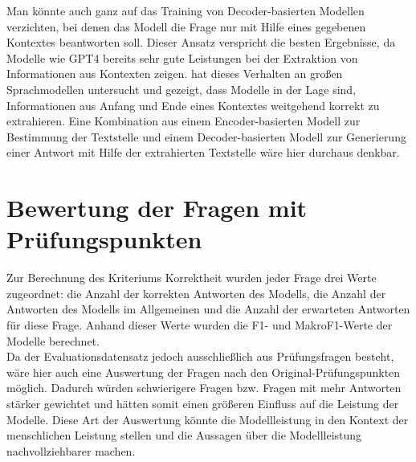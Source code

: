 Man könnte auch ganz auf das Training von Decoder-basierten Modellen verzichten, bei denen das Modell die Frage nur mit Hilfe eines gegebenen Kontextes beantworten soll.
Dieser Ansatz verspricht die besten Ergebnisse, da Modelle wie GPT4 bereits sehr gute Leistungen bei der Extraktion von Informationen aus Kontexten zeigen.
\citet{context-extract} hat dieses Verhalten an großen Sprachmodellen untersucht und gezeigt, dass Modelle in der Lage sind, Informationen aus Anfang und Ende eines Kontextes weitgehend korrekt zu extrahieren.
Eine Kombination aus einem Encoder-basierten Modell zur Bestimmung der Textstelle und einem Decoder-basierten Modell zur Generierung einer Antwort mit Hilfe der extrahierten Textstelle wäre hier durchaus denkbar.\\

\section{Bewertung der Fragen mit Prüfungspunkten}
Zur Berechnung des Kriteriums Korrektheit wurden jeder Frage drei Werte zugeordnet: die Anzahl der korrekten Antworten des Modells, die Anzahl der Antworten des Modells im Allgemeinen und die Anzahl der erwarteten Antworten für diese Frage.
Anhand dieser Werte wurden die F1- und MakroF1-Werte der Modelle berechnet.\\

Da der Evaluationsdatensatz jedoch ausschließlich aus Prüfungsfragen besteht, wäre hier auch eine Auswertung der Fragen nach den Original-Prüfungspunkten möglich.
Dadurch würden schwierigere Fragen bzw. Fragen mit mehr Antworten stärker gewichtet und hätten somit einen größeren Einfluss auf die Leistung der Modelle.
Diese Art der Auswertung könnte die Modellleistung in den Kontext der menschlichen Leistung stellen und die Aussagen über die Modellleistung nachvollziehbarer machen.
